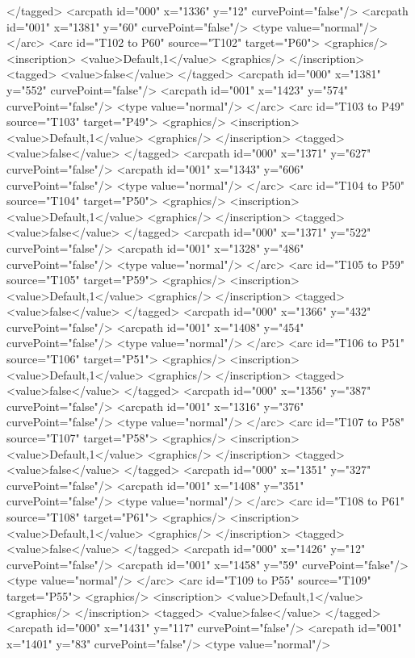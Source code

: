 </tagged>
<arcpath id="000" x="1336" y="12" curvePoint="false"/>
<arcpath id="001" x="1381" y="60" curvePoint="false"/>
<type value="normal"/>
</arc>
<arc id="T102 to P60" source="T102" target="P60">
<graphics/>
<inscription>
<value>Default,1</value>
<graphics/>
</inscription>
<tagged>
<value>false</value>
</tagged>
<arcpath id="000" x="1381" y="552" curvePoint="false"/>
<arcpath id="001" x="1423" y="574" curvePoint="false"/>
<type value="normal"/>
</arc>
<arc id="T103 to P49" source="T103" target="P49">
<graphics/>
<inscription>
<value>Default,1</value>
<graphics/>
</inscription>
<tagged>
<value>false</value>
</tagged>
<arcpath id="000" x="1371" y="627" curvePoint="false"/>
<arcpath id="001" x="1343" y="606" curvePoint="false"/>
<type value="normal"/>
</arc>
<arc id="T104 to P50" source="T104" target="P50">
<graphics/>
<inscription>
<value>Default,1</value>
<graphics/>
</inscription>
<tagged>
<value>false</value>
</tagged>
<arcpath id="000" x="1371" y="522" curvePoint="false"/>
<arcpath id="001" x="1328" y="486" curvePoint="false"/>
<type value="normal"/>
</arc>
<arc id="T105 to P59" source="T105" target="P59">
<graphics/>
<inscription>
<value>Default,1</value>
<graphics/>
</inscription>
<tagged>
<value>false</value>
</tagged>
<arcpath id="000" x="1366" y="432" curvePoint="false"/>
<arcpath id="001" x="1408" y="454" curvePoint="false"/>
<type value="normal"/>
</arc>
<arc id="T106 to P51" source="T106" target="P51">
<graphics/>
<inscription>
<value>Default,1</value>
<graphics/>
</inscription>
<tagged>
<value>false</value>
</tagged>
<arcpath id="000" x="1356" y="387" curvePoint="false"/>
<arcpath id="001" x="1316" y="376" curvePoint="false"/>
<type value="normal"/>
</arc>
<arc id="T107 to P58" source="T107" target="P58">
<graphics/>
<inscription>
<value>Default,1</value>
<graphics/>
</inscription>
<tagged>
<value>false</value>
</tagged>
<arcpath id="000" x="1351" y="327" curvePoint="false"/>
<arcpath id="001" x="1408" y="351" curvePoint="false"/>
<type value="normal"/>
</arc>
<arc id="T108 to P61" source="T108" target="P61">
<graphics/>
<inscription>
<value>Default,1</value>
<graphics/>
</inscription>
<tagged>
<value>false</value>
</tagged>
<arcpath id="000" x="1426" y="12" curvePoint="false"/>
<arcpath id="001" x="1458" y="59" curvePoint="false"/>
<type value="normal"/>
</arc>
<arc id="T109 to P55" source="T109" target="P55">
<graphics/>
<inscription>
<value>Default,1</value>
<graphics/>
</inscription>
<tagged>
<value>false</value>
</tagged>
<arcpath id="000" x="1431" y="117" curvePoint="false"/>
<arcpath id="001" x="1401" y="83" curvePoint="false"/>
<type value="normal"/>
